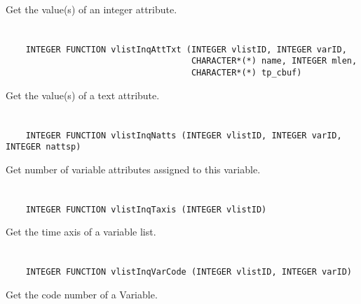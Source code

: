 Get the value(s) of an integer attribute.


\section*{\tt {}}

\begin{verbatim}
    INTEGER FUNCTION vlistInqAttTxt (INTEGER vlistID, INTEGER varID,
                                     CHARACTER*(*) name, INTEGER mlen,
                                     CHARACTER*(*) tp_cbuf)
\end{verbatim}

Get the value(s) of a text attribute.


\section*{\tt {}}

\begin{verbatim}
    INTEGER FUNCTION vlistInqNatts (INTEGER vlistID, INTEGER varID, INTEGER nattsp)
\end{verbatim}

Get number of variable attributes assigned to this variable.


\section*{\tt {}}

\begin{verbatim}
    INTEGER FUNCTION vlistInqTaxis (INTEGER vlistID)
\end{verbatim}

Get the time axis of a variable list.


\section*{\tt {}}

\begin{verbatim}
    INTEGER FUNCTION vlistInqVarCode (INTEGER vlistID, INTEGER varID)
\end{verbatim}

Get the code number of a Variable.


\section*{\tt {}}

